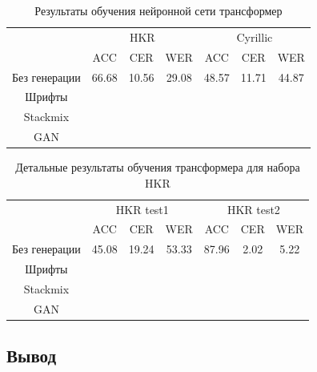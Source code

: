 \begin{table}[h!]
    \centering
    \begin{tabular}{|c|c|c|c|c|c|c|}
        \hline
              & \multicolumn{3}{c|}{HKR} & \multicolumn{3}{c|}{Cyrillic} \\
        \cline{2-7}
                         &  ACC  &  CER  &  WER  &  ACC  &  CER  &  WER  \\
        \hline
        \hline
        Без генерации    & 66.68 & 10.56 & 29.08 & 48.57 & 11.71 & 44.87 \\
        Шрифты           &       &       &       &       &       &       \\
        Stackmix         &       &       &       &       &       &       \\
        GAN              &       &       &       &       &       &       \\
        \hline
    \end{tabular}
    \caption{Результаты обучения нейронной сети трансформер}
    \label{tab:transformer_htr_results}
\end{table}

\begin{table}[h!]
    \centering
    \begin{tabular}{|c|c|c|c|c|c|c|}
        \hline
        & \multicolumn{3}{c|}{HKR test1} & \multicolumn{3}{c|}{HKR test2} \\
        \cline{2-7}
                         &  ACC  &  CER  &  WER  &  ACC  &  CER  &  WER  \\
        \hline
        \hline
        Без генерации    & 45.08 & 19.24 & 53.33 & 87.96 & 2.02  & 5.22  \\
        Шрифты           &       &       &       &       &       &       \\
        Stackmix         &       &       &       &       &       &       \\
        GAN              &       &       &       &       &       &       \\
        \hline
    \end{tabular}
    \caption{Детальные результаты обучения трансформера для набора HKR}
    \label{tab:transformer_htr_results_hkr}
\end{table}


\subsection{Вывод}
\label{subsec:experiment_conclusion}

